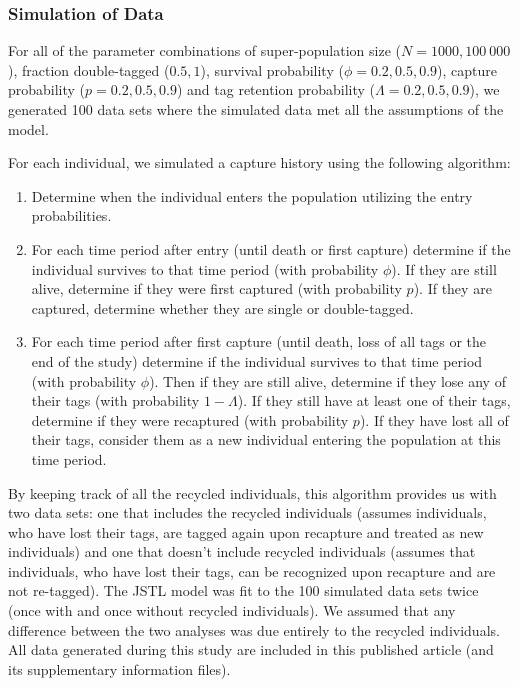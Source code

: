 \documentclass[12pt]{article}
\begin{document}
\subsubsection{Simulation of Data}\label{simulation-of-data}

For all of the parameter combinations of super-population size
(\(N=1 000, 100 \ 000\)), fraction double-tagged (\(0.5, 1\)), survival
probability (\(\phi=0.2,0.5,0.9\)), capture probability
(\(p=0.2,0.5,0.9\)) and tag retention probability
(\(\Lambda=0.2,0.5,0.9\)), we generated 100 data sets where the
simulated data met all the assumptions of the model.

For each individual, we simulated a capture history using the following
algorithm:

\begin{enumerate}
\def\labelenumi{\arabic{enumi}.}
\item
  Determine when the individual enters the population utilizing the
  entry probabilities.
\item
  For each time period after entry (until death or first capture) 
  determine if the individual survives to that time period (with
  probability \(\phi\)). If they are still alive, determine if they were
  first captured (with probability \(p\)). If they are captured,
  determine whether they are single or double-tagged.
\item
  For each time period after first capture (until death, loss of all
  tags or the end of the study) determine if the individual survives to
  that time period (with probability \(\phi\)). Then if they are still
  alive, determine if they lose any of their tags (with probability
  \(1-\Lambda\)). If they still have at least one of their tags,
  determine if they were recaptured (with probability \(p\)). If they
  have lost all of their tags, consider them as a new individual
  entering the population at this time period.
\end{enumerate}

By keeping track of all the recycled individuals, this algorithm 
provides us with two data sets: one that includes the recycled
individuals (assumes individuals, who have lost their tags, are tagged
again upon recapture and treated as new individuals) and one that
doesn't include recycled individuals (assumes that individuals, who
have lost their tags, can be recognized upon recapture and are not
re-tagged). The JSTL model was fit to the 100 simulated data sets twice
(once with and once without recycled individuals). We assumed that any
difference between the two analyses was due entirely to the recycled
individuals. All data generated during this study are included in this published article (and its supplementary information files).
\end{document}
